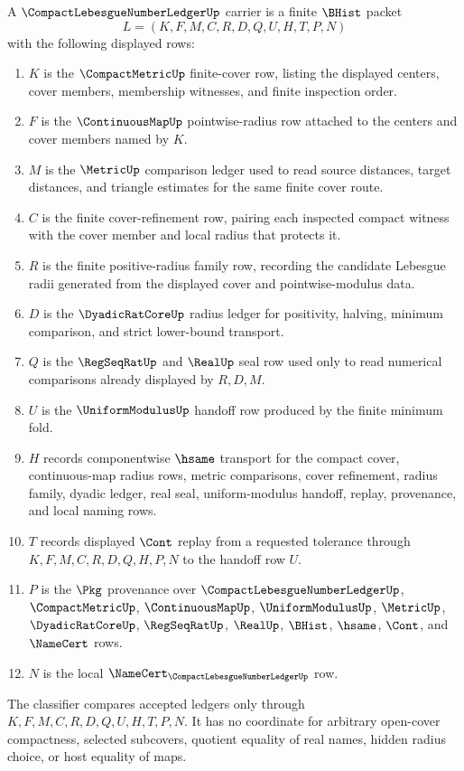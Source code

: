 \begin{definition}
\label{def:compact-lebesgue-number-ledger-carrier}
A $\CompactLebesgueNumberLedgerUp$ carrier is a finite $\BHist$ packet
$$
L=(K,F,M,C,R,D,Q,U,H,T,P,N)
$$
with the following displayed rows:
\begin{enumerate}
\item $K$ is the $\CompactMetricUp$ finite-cover row, listing the displayed centers, cover members, membership witnesses, and finite inspection order.
\item $F$ is the $\ContinuousMapUp$ pointwise-radius row attached to the centers and cover members named by $K$.
\item $M$ is the $\MetricUp$ comparison ledger used to read source distances, target distances, and triangle estimates for the same finite cover route.
\item $C$ is the finite cover-refinement row, pairing each inspected compact witness with the cover member and local radius that protects it.
\item $R$ is the finite positive-radius family row, recording the candidate Lebesgue radii generated from the displayed cover and pointwise-modulus data.
\item $D$ is the $\DyadicRatCoreUp$ radius ledger for positivity, halving, minimum comparison, and strict lower-bound transport.
\item $Q$ is the $\RegSeqRatUp$ and $\RealUp$ seal row used only to read numerical comparisons already displayed by $R,D,M$.
\item $U$ is the $\UniformModulusUp$ handoff row produced by the finite minimum fold.
\item $H$ records componentwise $\hsame$ transport for the compact cover, continuous-map radius rows, metric comparisons, cover refinement, radius family, dyadic ledger, real seal, uniform-modulus handoff, replay, provenance, and local naming rows.
\item $T$ records displayed $\Cont$ replay from a requested tolerance through $K,F,M,C,R,D,Q,H,P,N$ to the handoff row $U$.
\item $P$ is the $\Pkg$ provenance over $\CompactLebesgueNumberLedgerUp$, $\CompactMetricUp$, $\ContinuousMapUp$, $\UniformModulusUp$, $\MetricUp$, $\DyadicRatCoreUp$, $\RegSeqRatUp$, $\RealUp$, $\BHist$, $\hsame$, $\Cont$, and $\NameCert$ rows.
\item $N$ is the local $\NameCert_{\CompactLebesgueNumberLedgerUp}$ row.
\end{enumerate}
The classifier compares accepted ledgers only through $K,F,M,C,R,D,Q,U,H,T,P,N$. It has no coordinate for arbitrary open-cover compactness, selected subcovers, quotient equality of real names, hidden radius choice, or host equality of maps.
\end{definition}

